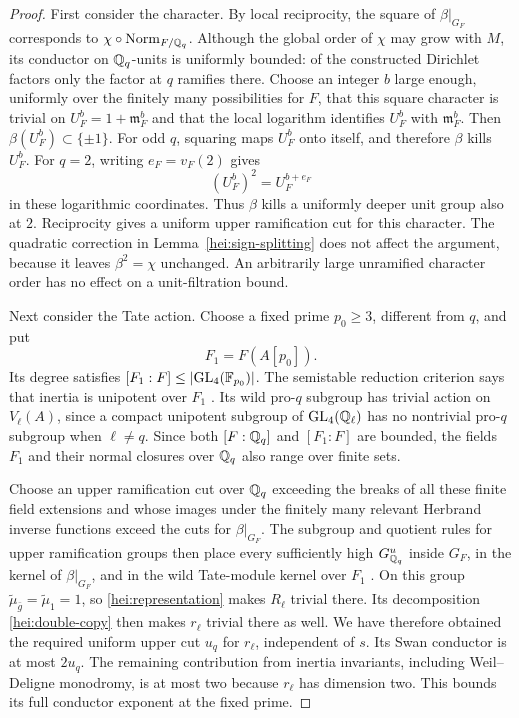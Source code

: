 \begin{proof}
First consider the character.  By local reciprocity, the square of
$\beta|_{G_F}$ corresponds to
$\chi\circ\operatorname{Norm}_{F/\mathbb Q_q}$.  Although the global order
of $\chi$ may grow with $M$, its conductor on $\mathbb Q_q$-units is
uniformly bounded: of the constructed Dirichlet factors only the
factor at $q$ ramifies there.  Choose an integer $b$ large enough,
uniformly over the finitely many possibilities for $F$, that this
square character is trivial on $U_F^b=1+\mathfrak m_F^b$ and that
the local logarithm identifies $U_F^b$ with $\mathfrak m_F^b$.
Then $\beta(U_F^b)\subset\{\pm1\}$.  For odd $q$, squaring maps
$U_F^b$ onto itself, and therefore $\beta$ kills $U_F^b$.  For
$q=2$, writing $e_F=v_F(2)$ gives
\[
                         (U_F^b)^2=U_F^{b+e_F}
\]
in these logarithmic coordinates.  Thus $\beta$ kills a uniformly
deeper unit group also at $2$.  Reciprocity gives a uniform upper
ramification cut for this character.  The quadratic correction in
Lemma~\ref{hei:sign-splitting} does not affect the argument, because
it leaves $\beta^2=\chi$ unchanged.  An arbitrarily large unramified
character order has no effect on a unit-filtration bound.

Next consider the Tate action.  Choose a fixed prime $p_0\ge3$,
different from $q$, and put
\[
                           F_1=F(A[p_0]).
\]
Its degree satisfies $[F_1:F]\le|\mathrm{GL}_4(\mathbb F_{p_0})|$.
The semistable reduction criterion says that inertia is unipotent
over $F_1$ \cite[Theorem 3.5]{SilverbergZarhin1995}.  Its wild
pro-$q$ subgroup has trivial action on $V_\ell(A)$, since a compact
unipotent subgroup of $\mathrm{GL}_4(\mathbb Q_\ell)$ has no nontrivial
pro-$q$ subgroup when $\ell\ne q$.  Since both $[F:\mathbb Q_q]$ and
$[F_1:F]$ are bounded, the fields $F_1$ and their normal closures
over $\mathbb Q_q$ also range over finite sets.

Choose an upper ramification cut over $\mathbb Q_q$ exceeding the breaks
of all these finite field extensions and whose images under the
finitely many relevant Herbrand inverse functions exceed the cuts
for $\beta|_{G_F}$.  The subgroup and quotient rules for upper
ramification groups then place every sufficiently high
$G_{\mathbb Q_q}^u$ inside $G_F$, in the kernel of $\beta|_{G_F}$, and in
the wild Tate-module kernel over $F_1$ \cite{Serre1979}.  On this
group $\widetilde\mu_{\bar g}=\widetilde\mu_1=1$, so
\eqref{hei:representation} makes $R_\ell$ trivial there.  Its
decomposition \eqref{hei:double-copy} then makes $r_\ell$ trivial
there as well.  We have therefore obtained the required uniform
upper cut $u_q$ for $r_\ell$, independent of $s$.  Its Swan conductor
is at most $2u_q$.  The remaining contribution from inertia
invariants, including Weil--Deligne monodromy, is at most two because
$r_\ell$ has dimension two.  This bounds its full conductor exponent
at the fixed prime.


\end{proof}
